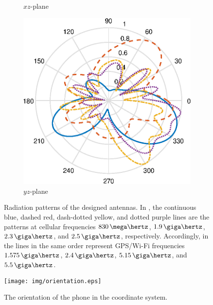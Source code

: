 \begin{figure}[H]
\begin{subfigure}[b]{0.3\textwidth}
        \caption{$xz$-plane}
        \label{fig:ff_xz_gpswifi}
    \end{subfigure}
    \begin{subfigure}[b]{0.3\textwidth}
        \includegraphics[width=\textwidth]{img/ff_gpswifi_yz.eps}
        \caption{$yz$-plane}
        \label{fig:ff_yz_gpswifi}
    \end{subfigure}
    \caption{Radiation patterns of the designed antennas. In , the continuous blue, dashed red, dash-dotted yellow, and dotted purple lines are the patterns at cellular frequencies $830\,\mega\hertz$, $1.9\,\giga\hertz$, $2.3\,\giga\hertz$, and $2.5\,\giga\hertz$, respectively. Accordingly, in  the lines in the same order represent GPS/Wi-Fi frequencies $1.575\,\giga\hertz$, $2.4\,\giga\hertz$, $5.15\,\giga\hertz$, and $5.5\,\giga\hertz$. }
    \label{fig:rad_patterns}
    \vspace{-10pt}
\end{figure}

\begin{figure}[H]
    \centering
    \texttt{[image: img/orientation.eps]}
    \caption{The orientation of the phone in the coordinate system.}
    \label{fig:orientation}
\end{figure}

